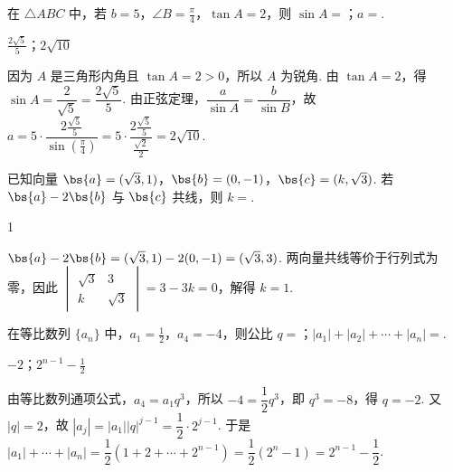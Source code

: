 \begin{problem}
在 \(\triangle ABC\) 中，若 \(b = 5\)，\(\angle B = \frac{\pi}{4}\)，\(\tan A = 2\)，则 \(\sin A=\)\fillinblank{}；\(a=\)\fillinblank{}.
\end{problem}

\begin{answer}
\(\frac{2\sqrt{5}}{5}\)；\(2\sqrt{10}\)
\end{answer}

\begin{solution}
因为 \(A\) 是三角形内角且 \(\tan A=2>0\)，所以 \(A\) 为锐角. 由 \(\tan A=2\)，得 \(\sin A=\dfrac{2}{\sqrt5}=\dfrac{2\sqrt5}{5}\). 由正弦定理，\(\dfrac a{\sin A}=\dfrac b{\sin B}\)，故
\(a=5\cdot\dfrac{2\frac{\sqrt5}{5}}{\sin(\frac{\pi}{4})}=5\cdot\dfrac{2\frac{\sqrt5}{5}}{\frac{\sqrt2}{2}}=2\sqrt{10}\).
\end{solution}

\begin{problem}
已知向量 \(\bs{a} = (\sqrt{3}, 1)\)，\(\bs{b} = (0, -1)\)，\(\bs{c} = (k, \sqrt{3})\). 若 \(\bs{a} - 2\bs{b}\) 与 \(\bs{c}\) 共线，则 \(k=\)\fillinblank{}.
\end{problem}

\begin{answer}
1
\end{answer}

\begin{solution}
\(\bs{a}-2\bs{b}=(\sqrt3,1)-2(0,-1)=(\sqrt3,3)\). 两向量共线等价于行列式为零，因此
\(\begin{vmatrix}\sqrt3&3\\ k&\sqrt3\end{vmatrix}=3-3k=0\)，解得 \(k=1\).
\end{solution}

\begin{problem}
在等比数列 \(\{a_n\}\) 中，\(a_1 = \frac{1}{2}\)，\(a_4 = -4\)，则公比 \(q=\)\fillinblank{}；\(|a_1| + |a_2| + \cdots + |a_n| = \)\fillinblank{}.
\end{problem}

\begin{answer}
\(-2\)；\(2^{n-1}-\frac{1}{2}\)
\end{answer}

\begin{solution}
由等比数列通项公式，\(a_4=a_1q^3\)，所以 \(-4=\dfrac12q^3\)，即 \(q^3=-8\)，得 \(q=-2\). 又 \(|q|=2\)，故 \(|a_j|=|a_1||q|^{j-1}=\dfrac12\cdot2^{j-1}\). 于是
\(|a_1|+\cdots+|a_n|=\dfrac12(1+2+\cdots+2^{n-1})=\dfrac12(2^n-1)=2^{n-1}-\dfrac12\).
\end{solution}

